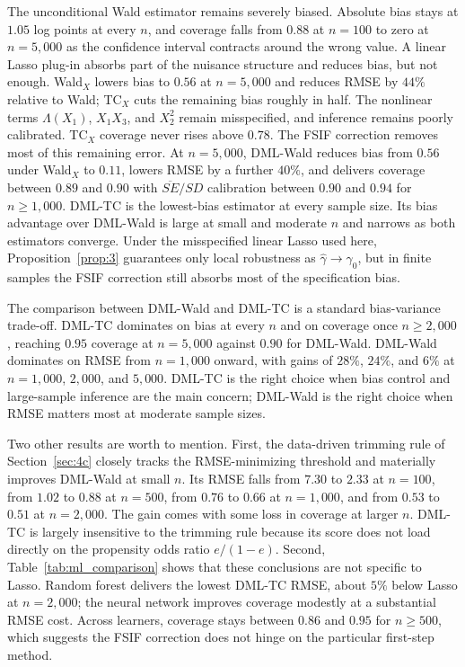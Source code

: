 The unconditional Wald estimator remains severely biased. Absolute bias stays at $1.05$ log points at every $n$, and coverage falls from $0.88$ at $n=100$ to zero at $n=5{,}000$ as the confidence interval contracts around the wrong value. A linear Lasso plug-in absorbs part of the nuisance structure and reduces bias, but not enough. Wald$_X$ lowers bias to $0.56$ at $n=5{,}000$ and reduces RMSE by $44\%$ relative to Wald; TC$_X$ cuts the remaining bias roughly in half. The nonlinear terms $\Lambda(X_1)$, $X_1X_3$, and $X_2^2$ remain misspecified, and inference remains poorly calibrated. TC$_X$ coverage never rises above $0.78$. The FSIF correction removes most of this remaining error. At $n=5{,}000$, DML-Wald reduces bias from $0.56$ under Wald$_X$ to $0.11$, lowers RMSE by a further $40\%$, and delivers coverage between $0.89$ and $0.90$ with $\overline{SE}/SD$ calibration between $0.90$ and $0.94$ for $n \geq 1{,}000$. DML-TC is the lowest-bias estimator at every sample size. Its bias advantage over DML-Wald is large at small and moderate $n$ and narrows as both estimators converge. Under the misspecified linear Lasso used here, Proposition~\ref{prop:3} guarantees only local robustness as $\hat\gamma \to \gamma_0$, but in finite samples the FSIF correction still absorbs most of the specification bias.

The comparison between DML-Wald and DML-TC is a standard bias-variance trade-off. DML-TC dominates on bias at every $n$ and on coverage once $n \geq 2{,}000$, reaching $0.95$ coverage at $n=5{,}000$ against $0.90$ for DML-Wald. DML-Wald dominates on RMSE from $n=1{,}000$ onward, with gains of $28\%$, $24\%$, and $6\%$ at $n=1{,}000$, $2{,}000$, and $5{,}000$. DML-TC is the right choice when bias control and large-sample inference are the main concern; DML-Wald is the right choice when RMSE matters most at moderate sample sizes.

Two other results are worth to mention. First, the data-driven trimming rule of Section~\ref{sec:4c} closely tracks the RMSE-minimizing threshold and materially improves DML-Wald at small $n$. Its RMSE falls from $7.30$ to $2.33$ at $n=100$, from $1.02$ to $0.88$ at $n=500$, from $0.76$ to $0.66$ at $n=1{,}000$, and from $0.53$ to $0.51$ at $n=2{,}000$. The gain comes with some loss in coverage at larger $n$. DML-TC is largely insensitive to the trimming rule because its score does not load directly on the propensity odds ratio $e/(1-e)$. Second, Table~\ref{tab:ml_comparison} shows that these conclusions are not specific to Lasso. Random forest delivers the lowest DML-TC RMSE, about $5\%$ below Lasso at $n=2{,}000$; the neural network improves coverage modestly at a substantial RMSE cost. Across learners, coverage stays between $0.86$ and $0.95$ for $n \geq 500$, which suggests the FSIF correction does not hinge on the particular first-step method.

